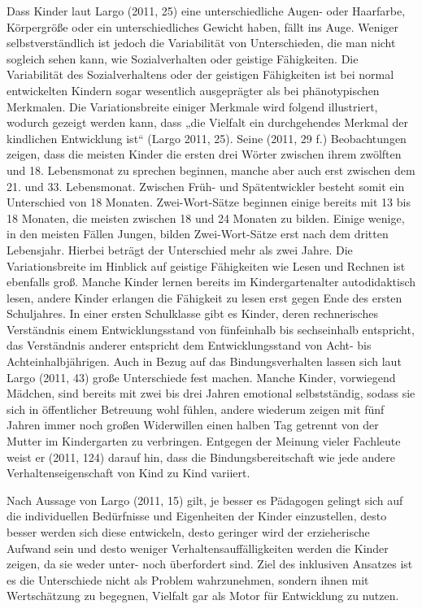 Dass Kinder laut Largo (2011, 25) eine unterschiedliche Augen- oder Haarfarbe, Körpergröße oder ein unterschiedliches Gewicht haben, fällt ins Auge. Weniger selbstverständlich ist jedoch die Variabilität von Unterschieden, die man nicht sogleich sehen kann, wie Sozialverhalten oder geistige Fähigkeiten. Die Variabilität des Sozialverhaltens oder der geistigen Fähigkeiten ist bei normal entwickelten Kindern sogar wesentlich ausgeprägter als bei phänotypischen Merkmalen. Die Variationsbreite einiger Merkmale wird folgend illustriert, wodurch gezeigt werden kann, dass „die Vielfalt ein durchgehendes Merkmal der kindlichen Entwicklung ist“ (Largo 2011, 25). Seine (2011, 29 f.) Beobachtungen zeigen, dass die meisten Kinder die ersten drei Wörter zwischen ihrem zwölften und 18. Lebensmonat zu sprechen beginnen, manche aber auch erst zwischen dem 21. und 33. Lebensmonat. Zwischen Früh- und Spätentwickler besteht somit ein Unterschied von 18 Monaten. Zwei-Wort-Sätze beginnen einige bereits mit 13 bis 18 Monaten, die meisten zwischen 18 und 24 Monaten zu bilden. Einige wenige, in den meisten Fällen Jungen, bilden Zwei-Wort-Sätze erst nach dem dritten Lebensjahr. Hierbei beträgt der Unterschied mehr als zwei Jahre. Die Variationsbreite im Hinblick auf geistige Fähigkeiten wie Lesen und Rechnen ist ebenfalls groß. Manche Kinder lernen bereits im Kindergartenalter autodidaktisch lesen, andere Kinder erlangen die Fähigkeit zu lesen erst gegen Ende des ersten Schuljahres. In einer ersten Schulklasse gibt es Kinder, deren rechnerisches Verständnis einem Entwicklungsstand von fünfeinhalb bis sechseinhalb entspricht, das Verständnis anderer entspricht dem Entwicklungsstand von Acht- bis Achteinhalbjährigen. Auch in Bezug auf das Bindungsverhalten lassen sich laut Largo (2011, 43) große Unterschiede fest machen. Manche Kinder, vorwiegend Mädchen, sind bereits mit zwei bis drei Jahren emotional selbstständig, sodass sie sich in öffentlicher Betreuung wohl fühlen, andere wiederum zeigen mit fünf Jahren immer noch großen Widerwillen einen halben Tag getrennt von der Mutter im Kindergarten zu verbringen. Entgegen der Meinung vieler Fachleute weist er (2011, 124) darauf hin, dass die Bindungsbereitschaft wie jede andere Verhaltenseigenschaft von Kind zu Kind variiert. 

Nach Aussage von Largo (2011, 15) gilt, je besser es Pädagogen gelingt sich auf die individuellen Bedürfnisse und Eigenheiten der Kinder einzustellen, desto besser werden sich diese entwickeln, desto geringer wird der erzieherische Aufwand sein und desto weniger Verhaltensauffälligkeiten werden die Kinder zeigen, da sie weder unter- noch überfordert sind.   
Ziel des inklusiven Ansatzes ist es die Unterschiede nicht als Problem wahrzunehmen, sondern ihnen mit Wertschätzung zu begegnen, Vielfalt gar als Motor für Entwicklung zu nutzen. 

